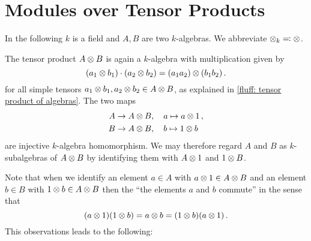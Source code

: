 \section{Modules over Tensor Products}


\begin{conventions}
  In the following $k$ is a field and $A, B$ are two $k$-algebras.
  We abbreviate $\mathbin{\otimes}_k \eqqcolon \mathbin{\otimes}$.
\end{conventions}


\begin{fluff}
  The tensor product $A \mathbin{\otimes} B$ is again a $k$-algebra with multiplication given by
  \[
      (a_1 \mathbin{\otimes} b_1) \cdot (a_2 \mathbin{\otimes} b_2)
    = (a_1 a_2) \mathbin{\otimes} (b_1 b_2) \,.
  \]
  for all simple tensors $a_1 \mathbin{\otimes} b_1, a_2 \mathbin{\otimes} b_2 \in A \mathbin{\otimes} B$, as explained in \ref{fluff: tensor product of algebras}.
  The two maps
  \begin{align*}
              A
      &\to    A \mathbin{\otimes} B,
      \quad   a
      \mapsto a \mathbin{\otimes} 1 \,,
  \\
              B
      &\to    A \mathbin{\otimes} B,
      \quad   b
      \mapsto 1 \mathbin{\otimes} b
  \end{align*}
  are injective $k$-algebra homomorphism.
  We may therefore regard $A$ and $B$ as $k$-subalgebras of $A \mathbin{\otimes} B$ by identifying them with $A \mathbin{\otimes} 1$ and $1 \mathbin{\otimes} B$.
  
  Note that when we identify an element $a \in A$ with $a \mathbin{\otimes} 1 \in A \mathbin{\otimes} B$ and an element $b \in B$ with $1 \mathbin{\otimes} b \in A \mathbin{\otimes} B$ then the \enquote{the elements $a$ and $b$ commute} in the sense that
  \[
      (a \mathbin{\otimes} 1)(1 \mathbin{\otimes} b)
    = a \mathbin{\otimes} b
    = (1 \mathbin{\otimes} b)(a \mathbin{\otimes} 1) \,.
  \]
  This observations leads to the following:
\end{fluff}


